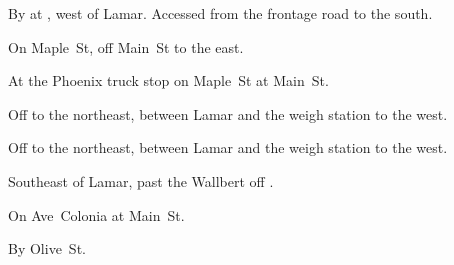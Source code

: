 
\begin{LocationList}

By  at , west of Lamar.
Accessed from the frontage road to the south.

On Maple~St, off   Main~St to the east.

At the Phoenix truck stop on Maple~St at   Main~St.

\Location{\GarageHQ \Garage}
Off   to the northeast, between Lamar and the weigh station to the west.

Off   to the northeast, between Lamar and the weigh station to the west.

Southeast of Lamar, past the Wallbert off  .

\Location{\TruckStop \Gas \Rest \Weigh}
On Ave~Colonia at   Main~St.

By   Olive~St.

\end{LocationList}

